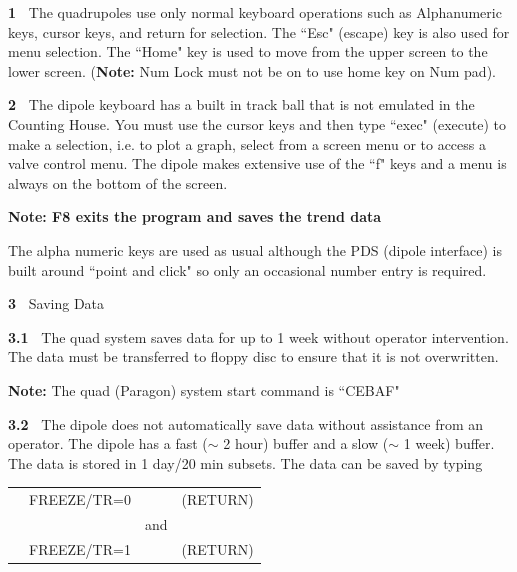 \begin{description}
\item{\bf 1~}\hskip0.1in The quadrupoles use only normal keyboard operations
such as
Alphanumeric keys, cursor keys, and return for selection.  The ``Esc"
(escape) key is also used for menu selection.  The ``Home" key is used to
move from the upper screen to the lower screen.  ({\bf Note:} Num Lock
must not be on to use home key on Num pad).
\item{\bf 2~}\hskip0.1in The dipole keyboard has a built in track ball that
is not
emulated in the Counting House.  You must use the cursor keys and then
type ``exec" (execute) to make a selection, i.e. to plot a graph, select
from a screen menu or to access a valve control menu.  The dipole makes
extensive use of the ``f" keys and a menu is always on the bottom of the
screen.
\item{}\hskip0.3in {\bf Note:  F8 exits the program and saves the trend data}
\item{}\hskip0.3in The alpha numeric keys are used as usual although the PDS
(dipole interface) is built around ``point and click" so only an occasional
number entry is required.
\item{\bf 3~}\hskip0.1in Saving Data
\item{\bf 3.1~}\hskip0.1in The quad system saves data for up to 1 week
without operator
intervention. The data must be transferred to floppy disc to ensure
that it is not overwritten.
\item{}\hskip0.3in {\bf Note:} The quad (Paragon) system start command is
``CEBAF"
\medskip
\item{\bf 3.2~}\hskip0.1in The dipole does not automatically save data without
assistance from an operator.  The dipole has a fast ($\sim$ 2 hour)
buffer and a slow ($\sim$ 1 week) buffer.  The data is stored in 1
day/20 min subsets.  The data can be saved by typing
\end{description}

\begin{center}
  \begin{tabular}{cccc}
	&FREEZE/TR=0 	&	& (RETURN)	\\
	&		& and	&		\\
	&FREEZE/TR=1	&	& (RETURN)	\\
  \end{tabular}
\end{center}

